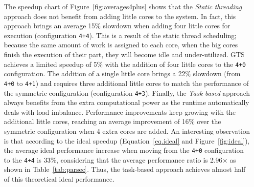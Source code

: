 The speedup chart of Figure~\ref{fig:averages4plus} shows that the \emph{Static threading} approach does not benefit from adding little cores to the system.
In fact, this approach brings an average 15\% slowdown when adding four little cores for execution (configuration \texttt{4+4}).
This is a result of the static thread scheduling; because the same amount of work is assigned to each core, when the big cores finish the execution of their part, they will become idle and under-utilized. 
GTS achieves a limited speedup of 5\% with the addition of four little cores to the \texttt{4+0} configuration. The addition of a single little core brings a 22\% slowdown (from \texttt{4+0} to \texttt{4+1}) and requires three additional little cores to match the performance of the symmetric configuration (configuration \texttt{4+3}).  Finally, the \emph{Task-based} approach always benefits from the extra computational power as the runtime automatically deals with load imbalance. Performance improvements keep growing with the additional little cores, reaching an average improvement of 16\% over the symmetric configuration when 4 extra cores are added. An interesting observation is that according to the ideal speedup (Equation~\ref{eq.ideal} and Figure~\ref{fig:ideal}), the average ideal performance increase when moving from the \texttt{4+0} configuration to the \texttt{4+4} is 33\%, considering that the average performance ratio is 2.96$\times$ as shown in Table~\ref{tab:parsec}. Thus, the task-based approach achieves almost half of this theoretical ideal performance.






